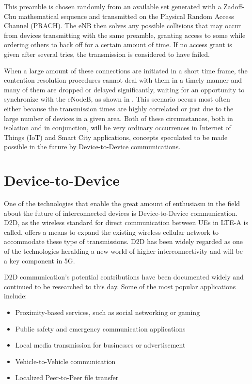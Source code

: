 This preamble is chosen randomly from an available set generated with a Zadoff-Chu mathematical sequence and transmitted on the Physical Random Access Channel (PRACH). The eNB then solves any possible collisions that may occur from devices transmitting with the same preamble, granting access to some while ordering others to back off for a certain amount of time. If no access grant is given after several tries, the transmission is considered to have failed.

When a large amount of these connections are initiated in a short time frame, the contention resolution procedures cannot deal with them in a timely manner and many of them are dropped or delayed significantly, waiting for an opportunity to synchronize with the eNodeB, as shown in \cite{Polese2016}. This scenario occurs most often either because the transmission times are highly correlated or just due to the large number of devices in a given area. Both of these circumstances, both in isolation and in conjunction, will be very ordinary occurrences in Internet of Things (IoT) and Smart City applications, concepts speculated to be made possible in the future by Device-to-Device communications. 

\section{Device-to-Device}\label{B:D2D}
One of the technologies that enable the great amount of enthusiasm in the field about the future of interconnected devices is Device-to-Device communication. D2D, as the wireless standard for direct communication between UEs in LTE-A is called, offers a means to expand the existing wireless cellular network to accommodate these type of transmissions. D2D has been widely regarded as one of the technologies heralding a new world of higher interconnectivity and will be a key component in 5G.

D2D communication's potential contributions have been documented widely and continued to be researched to this day. Some of the most popular applications include:
\begin{itemize}
\item Proximity-based services, such as social networking or gaming
\item Public safety and emergency communication applications
\item Local media transmission for businesses or advertisement
\item Vehicle-to-Vehicle communication
\item Localized Peer-to-Peer file transfer
\end{itemize}


